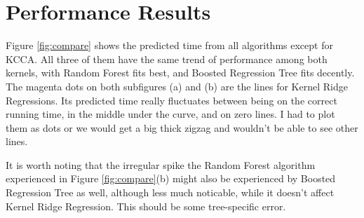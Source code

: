 \section{Performance Results} %

Figure \ref{fig:compare} shows the predicted time from all algorithms except for KCCA. All three of them have the same trend of performance among both kernels, with Random Forest fits best, and Boosted Regression Tree fits decently. The magenta dots on both subfigures (a) and (b) are the lines for Kernel Ridge Regressions. Its predicted time really fluctuates between being on the correct running time, in the middle under the curve, and on zero lines. I had to plot them as dots or we would get a big thick zigzag and wouldn't be able to see other lines.

It is worth noting that the irregular spike the Random Forest algorithm experienced in Figure \ref{fig:compare}(b) might also be experienced by Boosted Regression Tree as well, although less much noticable, while it doesn't affect Kernel Ridge Regression. This should be some tree-specific error.

